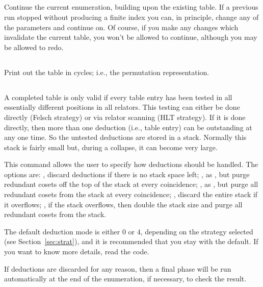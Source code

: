 \subsection{}

Continue the current enumeration, building upon the existing table.
If a previous run stopped without producing a finite index you can, in
  principle, change any of the parameters and continue on.
Of course, if you make any changes which invalidate the current table, you
  won't be allowed to continue, although you may be allowed to redo.

\subsection{}

Print out the table in cycles; i.e., the permutation representation.

\subsection{}

A completed table is only valid if every table entry has been tested in
  all essentially different positions in all relators.
This testing can either be done directly (Felsch strategy) or via relator
  scanning (HLT strategy).
If it is done directly, then more than one deduction (i.e., table entry)
  can be outstanding at any one time.
So the untested deductions are stored in a stack.
Normally this stack is fairly small but, during a collapse, it can become
  very large.

This command allows the user to specify how deductions should be handled.
The options are:
, discard deductions if there is no stack space left;
, as , but purge redundant cosets off the top of the stack
  at every coincidence;
, as , but purge all redundant cosets from the stack at 
  every coincidence;
, discard the entire stack if it overflows;
, if the stack overflows, then double the stack size and purge all
  redundant cosets from the stack.

The default deduction mode is either $0$ or $4$, depending on the strategy
  selected (see Section~\ref{sec:strat}), and it is recommended that you
  stay with the default.
If you want to know more details, read the code.

If deductions are discarded for any reason, then a final  phase
  will be run automatically at the end of the enumeration, if necessary, to
  check the result.

